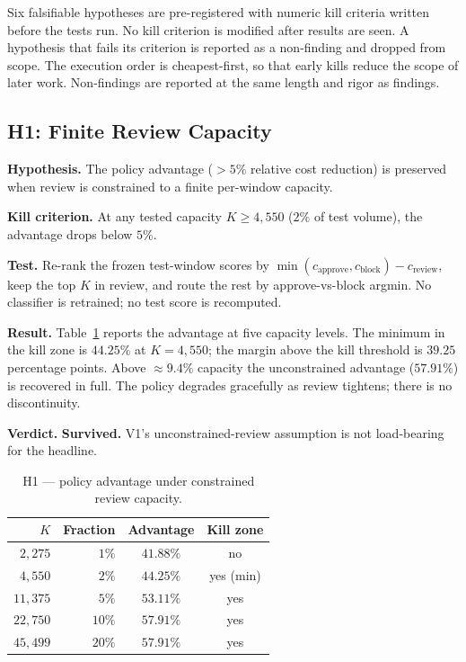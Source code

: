 \documentclass[conference]{IEEEtran}
\begin{document}
Six falsifiable hypotheses are pre-registered with numeric kill criteria
written before the tests run. No kill criterion is modified after results
are seen. A hypothesis that fails its criterion is reported as a
non-finding and dropped from scope. The execution order is cheapest-first,
so that early kills reduce the scope of later work. Non-findings are
reported at the same length and rigor as findings.

\subsection{H1: Finite Review Capacity}

\textbf{Hypothesis.} The policy advantage ($>5\%$ relative cost reduction)
is preserved when review is constrained to a finite per-window capacity.

\textbf{Kill criterion.} At any tested capacity $K \geq 4{,}550$ ($2\%$ of
test volume), the advantage drops below $5\%$.

\textbf{Test.} Re-rank the frozen test-window scores by
$\min(c_{\text{approve}}, c_{\text{block}}) - c_{\text{review}}$, keep the
top $K$ in review, and route the rest by approve-vs-block argmin. No
classifier is retrained; no test score is recomputed.

\textbf{Result.} Table~\ref{tab:h1} reports the advantage at five capacity
levels. The minimum in the kill zone is $44.25\%$ at $K = 4{,}550$; the
margin above the kill threshold is $39.25$ percentage points. Above
$\approx 9.4\%$ capacity the unconstrained advantage ($57.91\%$) is
recovered in full. The policy degrades gracefully as review tightens; there
is no discontinuity.

\textbf{Verdict.} \textbf{Survived.} V1's unconstrained-review assumption is
not load-bearing for the headline.

\begin{table}[!t]
\caption{H1 — policy advantage under constrained review capacity.}
\label{tab:h1}
\centering
\small
\begin{tabular}{rrcc}
\toprule
$K$ & Fraction & Advantage & Kill zone \\
\midrule
$2{,}275$  & $1\%$  & $41.88\%$ & no \\
$4{,}550$  & $2\%$  & $44.25\%$ & yes (min) \\
$11{,}375$ & $5\%$  & $53.11\%$ & yes \\
$22{,}750$ & $10\%$ & $57.91\%$ & yes \\
$45{,}499$ & $20\%$ & $57.91\%$ & yes \\
\bottomrule
\end{tabular}
\end{table}
\end{document}
